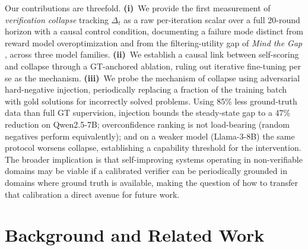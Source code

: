 \documentclass{article}
\begin{document}
Our contributions are threefold.
\textbf{(i)}~We provide the first measurement of \emph{verification collapse}
tracking $\Delta_t$ as a raw per-iteration scalar over a full 20-round horizon
with a causal control condition, documenting a failure mode distinct from reward model
overoptimization \citep{gao2023scaling} and from the filtering-utility gap of
\emph{Mind the Gap} \citep{song2025mindthegap}, across three model families.
\textbf{(ii)}~We establish a causal link between self-scoring and collapse
through a GT-anchored ablation, ruling out iterative fine-tuning per se as
the mechanism.
\textbf{(iii)}~We probe the mechanism of collapse using adversarial
hard-negative injection, periodically replacing a fraction of the
training batch with gold solutions for incorrectly solved problems.
Using 85\% less ground-truth data than full GT supervision, injection
bounds the steady-state gap to a 47\% reduction on Qwen2.5-7B;
overconfidence ranking is not load-bearing (random negatives perform
equivalently); and on a weaker model (Llama-3-8B) the same protocol
worsens collapse, establishing a capability threshold for the
intervention.
The broader implication is that self-improving systems operating in
non-verifiable domains may be viable if a calibrated verifier can be
periodically grounded in domains where ground truth is available, making the
question of how to transfer that calibration a direct avenue for future work.

\section{Background and Related Work}
\label{sec:related}
\end{document}
